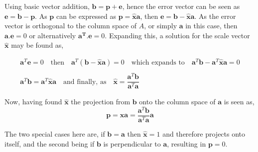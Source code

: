             \par \hfill \break
            Using basic vector addition, \(\boldsymbol{b}=\boldsymbol{p} + \boldsymbol{e}\), hence the error vector can
            be seen as \(\boldsymbol{e}=\boldsymbol{b} - \boldsymbol{p}\). As \(\boldsymbol{p}\) can be expressed as 
            \(\boldsymbol{p}=\boldsymbol{\hat{x}a}\), then \(\boldsymbol{e} = \boldsymbol{b} - 
            \boldsymbol{\hat{x} a}\). As the error vector is orthogonal to the column space of \(A\), or simply 
            \(\boldsymbol{a}\) in this case, then \(\boldsymbol{a.e} = 0\) or alternatively \(\boldsymbol{a^T.e} = 0\). 
            Expanding this, a solution for the scale vector \(\boldsymbol{\hat{x}}\) may be found as,

            \begin{equation}
                \begin{split}
                \boldsymbol{a}^T\boldsymbol{e} = 0
                \quad \textrm{then} \quad
                \boldsymbol{a}^T (\boldsymbol{b} - \boldsymbol{\hat{x}a}) = 0
                \quad \textrm{which expands to} \quad
                \boldsymbol{a}^T \boldsymbol{b} - \boldsymbol{a}^T \boldsymbol{\hat{x}a} = 0
                \\ \\
                \boldsymbol{a}^T \boldsymbol{b} = \boldsymbol{a}^T \boldsymbol{\hat{x}a}
                \quad \textrm{and finally, as} \quad
                \boldsymbol{\hat{x}} = \dfrac{\boldsymbol{a}^T \boldsymbol{b}}{\boldsymbol{a}^T \boldsymbol{a}} 
                \end{split}
            \end{equation}

            \par \hfill \break
            Now, having found \(\boldsymbol{\hat{x}}\) the projection from \(\boldsymbol{b}\) onto the column space of 
            \(\boldsymbol{a}\) is seen as,
            \begin{equation}
                \boldsymbol{p} = 
                \boldsymbol{\hat{x}a} = \dfrac{\boldsymbol{a}^T \boldsymbol{b}}{\boldsymbol{a}^T \boldsymbol{a}} 
                \boldsymbol{a}
            \end{equation}

            \par \hfill \break
            The two special cases here are, if \(\boldsymbol{b} = \boldsymbol{a}\) then \(\boldsymbol{\hat{x}} = 1\) 
            and therefore projects onto itself, and the second being if \(\boldsymbol{b}\) is perpendicular to 
            \(\boldsymbol{a}\), resulting in \(\boldsymbol{p} = 0\).

